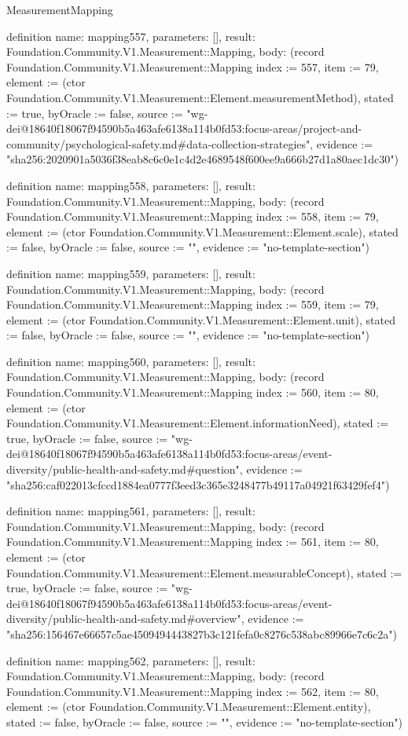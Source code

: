 \begin{lexlean}{MeasurementMapping}
\begin{semanticmodule}
definition{
  name: mapping557,
  parameters: [],
  result: Foundation.Community.V1.Measurement::Mapping,
  body: (record Foundation.Community.V1.Measurement::Mapping {index := 557, item := 79, element := (ctor Foundation.Community.V1.Measurement::Element.measurementMethod), stated := true, byOracle := false, source := "wg-dei@18640f18067f94590b5a463afe6138a114b0fd53:focus-areas/project-and-community/psychological-safety.md#data-collection-strategies", evidence := "sha256:2020901a5036f38eab8c6c0e1c4d2e4689548f600ee9a666b27d1a80aec1dc30"})
}

definition{
  name: mapping558,
  parameters: [],
  result: Foundation.Community.V1.Measurement::Mapping,
  body: (record Foundation.Community.V1.Measurement::Mapping {index := 558, item := 79, element := (ctor Foundation.Community.V1.Measurement::Element.scale), stated := false, byOracle := false, source := "", evidence := "no-template-section"})
}

definition{
  name: mapping559,
  parameters: [],
  result: Foundation.Community.V1.Measurement::Mapping,
  body: (record Foundation.Community.V1.Measurement::Mapping {index := 559, item := 79, element := (ctor Foundation.Community.V1.Measurement::Element.unit), stated := false, byOracle := false, source := "", evidence := "no-template-section"})
}

definition{
  name: mapping560,
  parameters: [],
  result: Foundation.Community.V1.Measurement::Mapping,
  body: (record Foundation.Community.V1.Measurement::Mapping {index := 560, item := 80, element := (ctor Foundation.Community.V1.Measurement::Element.informationNeed), stated := true, byOracle := false, source := "wg-dei@18640f18067f94590b5a463afe6138a114b0fd53:focus-areas/event-diversity/public-health-and-safety.md#question", evidence := "sha256:caf022013cfccd1884ea0777f3eed3c365e3248477b49117a04921f63429fef4"})
}

definition{
  name: mapping561,
  parameters: [],
  result: Foundation.Community.V1.Measurement::Mapping,
  body: (record Foundation.Community.V1.Measurement::Mapping {index := 561, item := 80, element := (ctor Foundation.Community.V1.Measurement::Element.measurableConcept), stated := true, byOracle := false, source := "wg-dei@18640f18067f94590b5a463afe6138a114b0fd53:focus-areas/event-diversity/public-health-and-safety.md#overview", evidence := "sha256:156467e66657c5ae4509494443827b3c121fefa0c8276c538abc89966e7c6c2a"})
}

definition{
  name: mapping562,
  parameters: [],
  result: Foundation.Community.V1.Measurement::Mapping,
  body: (record Foundation.Community.V1.Measurement::Mapping {index := 562, item := 80, element := (ctor Foundation.Community.V1.Measurement::Element.entity), stated := false, byOracle := false, source := "", evidence := "no-template-section"})
}


\end{semanticmodule}
\end{lexlean}

